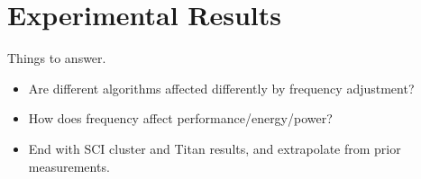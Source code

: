 \section{Experimental Results}

{\color{red} Things to answer.}
\begin{itemize}
\item Are different algorithms affected differently by frequency adjustment?
\item How does frequency affect performance/energy/power?
\item End with SCI cluster and Titan results, and extrapolate from prior 
measurements.
\end{itemize}
